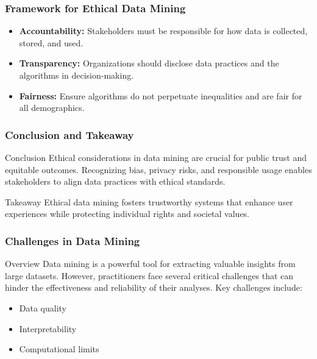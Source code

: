 \documentclass{beamer}
\begin{document}
\begin{frame}[fragile]
    \frametitle{Framework for Ethical Data Mining}
    \begin{itemize}
        \item \textbf{Accountability:} Stakeholders must be responsible for how data is collected, stored, and used.
        \item \textbf{Transparency:} Organizations should disclose data practices and the algorithms in decision-making.
        \item \textbf{Fairness:} Ensure algorithms do not perpetuate inequalities and are fair for all demographics.
    \end{itemize}
\end{frame}

\begin{frame}[fragile]
    \frametitle{Conclusion and Takeaway}
    \begin{block}{Conclusion}
        Ethical considerations in data mining are crucial for public trust and equitable outcomes. Recognizing bias, privacy risks, and responsible usage enables stakeholders to align data practices with ethical standards.
    \end{block}
    
    \begin{block}{Takeaway}
        Ethical data mining fosters trustworthy systems that enhance user experiences while protecting individual rights and societal values.
    \end{block}
\end{frame}

\begin{frame}[fragile]
    \frametitle{Challenges in Data Mining}
    \begin{block}{Overview}
        Data mining is a powerful tool for extracting valuable insights from large datasets. However, practitioners face several critical challenges that can hinder the effectiveness and reliability of their analyses. Key challenges include:
        \begin{itemize}
            \item Data quality
            \item Interpretability
            \item Computational limits
        \end{itemize}
    \end{block}
\end{frame}
\end{document}
